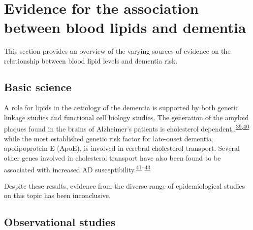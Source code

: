 \documentclass[a4paper, twoside]{templates/ociamthesis}
\begin{document}
~

\hypertarget{evidence-association}{%
\section{Evidence for the association between blood lipids and dementia}\label{evidence-association}}

This section provides an overview of the varying sources of evidence on the relationship between blood lipid levels and dementia risk.

\hypertarget{basic-science}{%
\subsection{Basic science}\label{basic-science}}

A role for lipids in the aetiology of the dementia is supported by both genetic linkage studies and functional cell biology studies. The generation of the amyloid plaques found in the brains of Alzheimer's patients is cholesterol dependent,,\textsuperscript{\protect\hyperlink{ref-burns2003}{39},\protect\hyperlink{ref-mizuno1999}{40}} while the most established genetic risk factor for late-onset dementia, apolipoprotein E (ApoE), is involved in cerebral cholesterol transport. Several other genes involved in cholesterol transport have also been found to be associated with increased AD susceptibility.\textsuperscript{\protect\hyperlink{ref-beecham2014}{41}--\protect\hyperlink{ref-meng2007}{43}}

Despite these results, evidence from the diverse range of epidemiological studies on this topic has been inconclusive.

\hypertarget{observational-studies}{%
\subsection{Observational studies}\label{observational-studies}}
\end{document}
